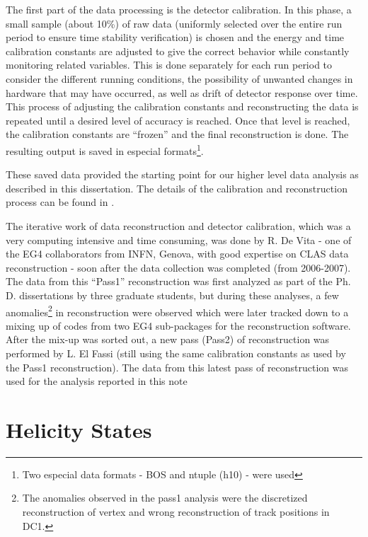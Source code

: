The first part of the data processing is the detector calibration. In this phase, a small sample (about 10\%) of raw data (uniformly selected over the entire run period to ensure time stability verification) is chosen and the energy and time calibration constants are adjusted to give the correct behavior while constantly monitoring related variables. This is done separately for each run period to consider the different running conditions, the possibility of unwanted changes in hardware that may have occurred, as well as drift of detector response over time. This process of adjusting the calibration constants and reconstructing the data is repeated until a desired level of accuracy is reached. Once that level is reached, the calibration constants are ``frozen'' and the final reconstruction is done. The resulting output is saved in especial formats\footnote{Two especial data formats - BOS and ntuple (h10) - were used}. 

These saved data provided the starting point for our higher level data analysis as described in this dissertation. The details of the calibration and reconstruction process can be found in \cite{rdVita_th}.

The iterative work of data reconstruction and detector calibration, which was a very computing intensive and time consuming, was done by R. De Vita - one of the EG4 collaborators from  INFN, Genova, with good expertise on CLAS data reconstruction - soon after the data collection was completed (from 2006-2007). The data from this ``Pass1'' reconstruction was first analyzed as part of the Ph. D. dissertations by three graduate students, but during these analyses, a few anomalies\footnote{The anomalies observed in the pass1 analysis were the discretized reconstruction of vertex and wrong reconstruction of track positions in DC1.} in reconstruction were observed which were later tracked down to a %
mixing up of codes from two EG4 sub-packages for the reconstruction software. After the mix-up was sorted out, a new pass (Pass2) of reconstruction was performed by L. El Fassi (still using the same calibration constants as used by the Pass1 reconstruction). The data from this latest pass of reconstruction was used for the analysis reported in this note 


\section{Helicity States}


